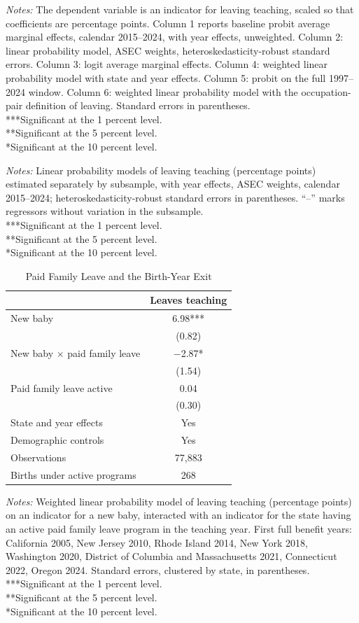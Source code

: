 \documentclass[11pt,a4paper]{article}
\newcommand{\fignote}[1]{\par\vspace{4pt}%
  \begin{minipage}{\linewidth}\footnotesize\color{ecgray}#1\end{minipage}}
\newcommand{\starlegend}{\\[2pt]
\hspace*{0pt}***Significant at the 1 percent level.\\
\hspace*{0pt}\phantom{*}**Significant at the 5 percent level.\\
\hspace*{0pt}\phantom{**}*Significant at the 10 percent level.}
\begin{document}
\begin{table}[H]
\centering\footnotesize
\caption{Robustness of the Attrition Model}

\fignote{\textit{Notes:} The dependent variable is an indicator for
leaving teaching, scaled so that coefficients are percentage points.
Column 1 reports baseline probit average marginal effects, calendar
2015--2024, with year effects, unweighted. Column 2: linear
probability model, ASEC weights, heteroskedasticity-robust standard
errors. Column 3: logit average marginal effects. Column 4: weighted
linear probability model with state and year effects. Column 5: probit
on the full 1997--2024 window. Column 6: weighted linear probability
model with the occupation-pair definition of leaving. Standard errors
in parentheses.\starlegend}
\end{table}
\clearpage

\begin{table}[H]
\centering\footnotesize
\caption{The Attrition Model in Subsamples}

\fignote{\textit{Notes:} Linear probability models of leaving teaching
(percentage points) estimated separately by subsample, with year
effects, ASEC weights, calendar 2015--2024;
heteroskedasticity-robust standard errors in parentheses. ``--'' marks
regressors without variation in the subsample.\starlegend}
\end{table}

\begin{table}[H]
\centering\small
\caption{Paid Family Leave and the Birth-Year Exit}
\begin{tabular}{lc}
\toprule
 & Leaves teaching \\
\midrule
New baby & 6.98*** \\
 & (0.82) \\
New baby $\times$ paid family leave & $-$2.87* \\
 & (1.54) \\
Paid family leave active & 0.04 \\
 & (0.30) \\
\midrule
State and year effects & Yes \\
Demographic controls & Yes \\
Observations & 77,883 \\
Births under active programs & 268 \\
\bottomrule
\end{tabular}
\fignote{\textit{Notes:} Weighted linear probability model of leaving
teaching (percentage points) on an indicator for a new baby,
interacted with an indicator for the state having an active paid
family leave program in the teaching year. First full benefit years:
California 2005, New Jersey 2010, Rhode Island 2014, New York 2018,
Washington 2020, District of Columbia and Massachusetts 2021,
Connecticut 2022, Oregon 2024. Standard errors, clustered by state, in
parentheses.\starlegend}
\end{table}
\end{document}
